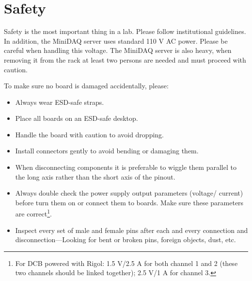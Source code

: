 \section{Safety}
Safety is the most important thing in a lab. Please follow institutional guidelines.
In addition, the MiniDAQ server uses standard 110 V AC power. Please be careful
when handling this voltage.
The MiniDAQ server is also heavy, when removing it from the rack at least two
persons are needed and must proceed with caution.

To make sure no board is damaged accidentally, please:
\begin{itemize}
    \item Always wear ESD-safe straps.
    \item Place all boards on an ESD-safe desktop.
    \item Handle the board with caution to avoid dropping.
    \item Install connectors gently to avoid bending or damaging them.
    \item When disconnecting components it is preferable to wiggle them parallel
        to the long axis rather than the short axis of the pinout.
    \item Always double check the power supply output parameters (voltage/
        current) before turn them on or connect them to boards.
        Make sure these parameters are correct\footnote{
            For DCB powered with Rigol: 1.5 V/2.5 A for both channel 1 and 2
            (these two channels should be linked together); 2.5 V/1 A for
            channel 3.
        }.
    \item Inspect every set of male and female pins after each and every
        connection and disconnection---Looking for bent or broken pins, foreign
        objects, dust, etc.
\end{itemize}
